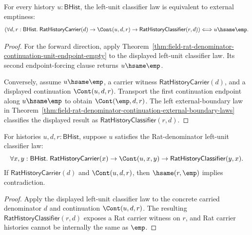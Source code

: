 \begin{theorem}
\label{thm:field-rat-denominator-continuation-left-unit-endpoint-iff-empty}
For every history $u:\mathsf{BHist}$, the left-unit classifier law is equivalent
to external emptiness:
$$
\left(
\forall d,r:\mathsf{BHist}.\;
\mathsf{RatHistoryCarrier}(d)\to
\Cont(u,d,r)\to
\mathsf{RatHistoryClassifier}(r,d)
\right)
\Longleftrightarrow
u\hsame\emp.
$$
\end{theorem}
\begin{proof}
For the forward direction, apply
Theorem~\ref{thm:field-rat-denominator-continuation-unit-endpoint-empty} to
the displayed left-unit classifier law. Its second endpoint-forcing clause
returns $u\hsame\emp$.

Conversely, assume $u\hsame\emp$, a carrier witness
$\mathsf{RatHistoryCarrier}(d)$, and a displayed continuation
$\Cont(u,d,r)$. Transport the first continuation endpoint along
$u\hsame\emp$ to obtain $\Cont(\emp,d,r)$. The left external-boundary law in
Theorem~\ref{thm:field-rat-denominator-continuation-external-boundary-laws}
classifies the displayed result as
$\mathsf{RatHistoryClassifier}(r,d)$.
\end{proof}

\begin{theorem}
\label{thm:field-rat-denominator-continuation-left-unit-result-not-empty}
For histories $u,d,r:\mathsf{BHist}$, suppose $u$ satisfies the
Rat-denominator left-unit classifier law:
$$
\forall x,y:\mathsf{BHist}.\;
\mathsf{RatHistoryCarrier}(x)\to
\Cont(u,x,y)\to
\mathsf{RatHistoryClassifier}(y,x).
$$
If $\mathsf{RatHistoryCarrier}(d)$ and $\Cont(u,d,r)$, then
$\hsame(r,\emp)$ implies contradiction.
\end{theorem}
\begin{proof}
Apply the displayed left-unit classifier law to the concrete carried
denominator $d$ and continuation $\Cont(u,d,r)$. The resulting
$\mathsf{RatHistoryClassifier}(r,d)$ exposes a Rat carrier witness on $r$,
and Rat carrier histories cannot be internally the same as $\emp$.
\end{proof}

